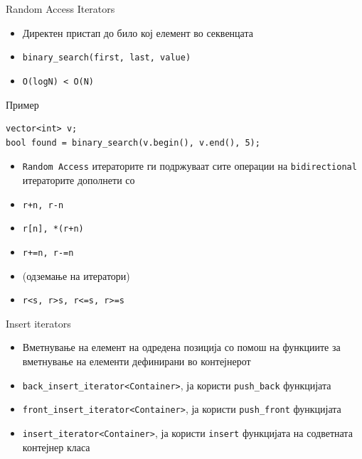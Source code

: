 \begin{frame}[fragile]{Random Access Iterators}
\begin{itemize}
  \item Директен пристап до било кој елемент во секвенцата
  \item \texttt{binary\_search(first, last, value)}
  \item \texttt{O(logN) < O(N)}
\end{itemize}
\begin{block}{Пример}
\begin{lstlisting}
vector<int> v;
bool found = binary_search(v.begin(), v.end(), 5);
\end{lstlisting}
\end{block}
\begin{itemize}
\item \texttt{Random Access} итераторите ги подржуваат сите операции на \texttt{bidirectional}
итераторите дополнети со
\item \texttt{r+n, r-n}
\item \texttt{r[n], *(r+n)}
\item \texttt{r+=n, r-=n}
\item {} (одземање на итератори)
\item \texttt{r<s, r>s, r<=s, r>=s}
\end{itemize}
\end{frame}

\begin{frame}[fragile]{Insert iterators}
\begin{itemize}
  \item Вметнување на елемент на одредена позиција со помош на функциите за
  вметнување на елементи дефинирани во контејнерот 
  \item \texttt{back\_insert\_iterator<Container>}, ја користи
  \texttt{push\_back} функцијата
  \item \texttt{front\_insert\_iterator<Container>}, ја користи
  \texttt{push\_front} функцијата
  \item \texttt{insert\_iterator<Container>}, ја користи \texttt{insert}
  функцијата на содветната контејнер класа
\end{itemize}
\end{frame}

